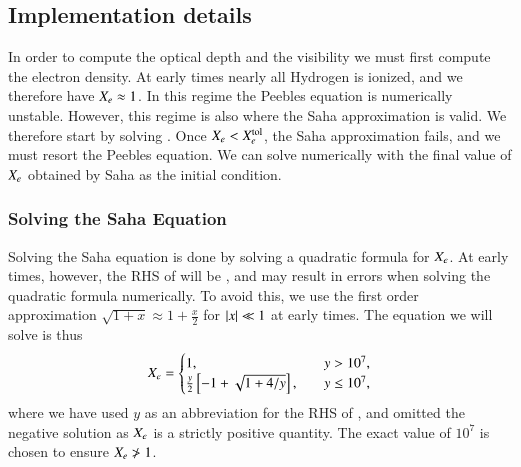 
\subsection{Implementation details}\label{ssec:M2:implementations} 

In order to compute the optical depth and the visibility we must first compute the electron density. At early times nearly all Hydrogen is ionized, and we therefore have $X_e \approx 1$. In this regime the Peebles equation is numerically unstable. However, this regime is also where the Saha approximation is valid. We therefore start by solving . Once $X_e<X_e^\mathrm{tol}$, the Saha approximation fails, and we must resort the Peebles equation. We can solve  numerically with the final value of $X_e$ obtained by Saha as the initial condition. 

\subsubsection{Solving the Saha Equation}\label{sssec:M2:implementations:solving_saha}
Solving the Saha equation is done by solving a quadratic formula for $X_e$. At early times, however, the RHS of  will be , and may result in errors when solving the quadratic formula numerically. To avoid this, we use the first order approximation $\sqrt{1+x}\approx 1 + \frac{x}{2}$ for $\abs{x}\ll1$ at early times. The equation we will solve is thus 
\begin{equation}
    X_e = \begin{cases}
        1, \quad & y>10^7, \\
        \frac{y}{2}\left[ -1 + \sqrt{1 + 4/y} \right],\quad & y\leq 10^7,
    \end{cases}
\end{equation}  
where we have used $y$ as an abbreviation for the RHS of , and omitted the negative solution as $X_e$ is a strictly positive quantity. The exact value of $10^7$ is chosen to ensure $X_e \ngtr 1$. 

